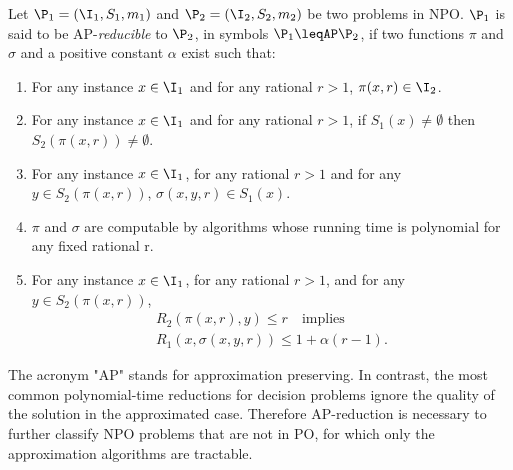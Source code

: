 \begin{definition}\label{def:AP-red}
Let $\P_1=(\I_1,S_1,m_1)$ and $\P_2=(\I_2,S_2,m_2)$ be two problems in NPO. $\P_1$ is said to be AP-{\em reducible} to $\P_2$, in symbols $\P_1 \leqAP \P_2$, if two functions $\pi$ and $\sigma$ and a positive constant $\alpha$ exist such that:
\begin{enumerate}
\item For any instance $x\in \I_1$ and for any rational $r > 1$, $\pi(x, r) \in \I_2$.
\item For any instance $x\in \I_1$ and for any rational $r > 1$, if $S_1(x) \neq \emptyset$ then $S_2(\pi(x,r)) \neq \emptyset$.
\item For any instance $x\in \I_1$, for any rational $r > 1$ and for any $y \in S_2(\pi(x,r))$, $\sigma(x, y, r) \in S_1(x)$.
\item $\pi$ and $\sigma$ are computable by algorithms whose running time is polynomial for any fixed rational r.
\item For any instance $x\in \I_1$, for any rational $r > 1$, and for any $y \in S_2(\pi(x,r))$,
\begin{align} \label{eq:AP-red}
R_2(\pi(x,r),y) \leq r \quad \text{implies} \\
R_1(x, \sigma(x, y, r)) \leq 1 + \alpha(r-1).
\end{align}
\end{enumerate}
\end{definition}

The acronym "AP" stands for approximation preserving. In contrast, the most common polynomial-time reductions for decision problems ignore the quality of the solution in the approximated case. Therefore AP-reduction is necessary to further classify NPO problems that are not in PO, for which only the approximation algorithms are tractable.




